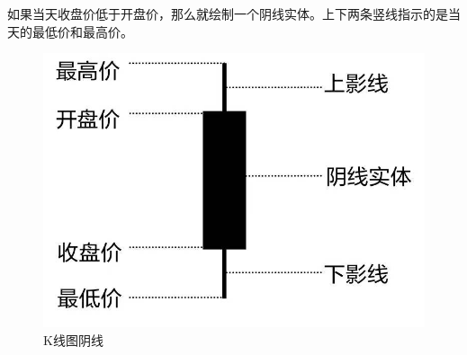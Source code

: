 \documentclass[12pt,oneside]{book}
\begin{document}
如果当天收盘价低于开盘价，那么就绘制一个阴线实体。上下两条竖线指示的是当天的最低价和最高价。

\begin{figure}[H]
\centering
\includegraphics[width=\linewidth ,totalheight=0.95\textheight , keepaspectratio]{K线图阴线.jpg}
\caption{K线图阴线}
\end{figure}
\end{document}

